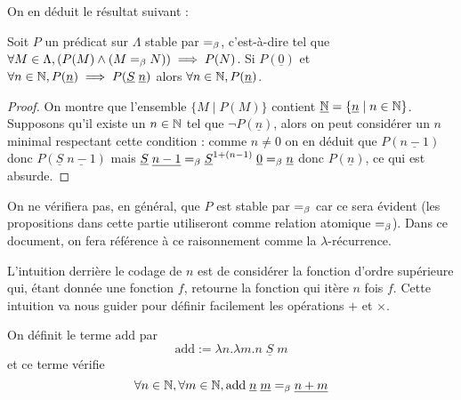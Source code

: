 On en déduit le résultat suivant :

\begin{cor}
    Soit $P$ un prédicat sur $\Lambda$ stable par $=_\beta$, c'est-à-dire tel que $\forall M\in\Lambda, (P(M)\land (M=_\beta N))\implies P(N)$. Si $P(\underline 0)$ et $\forall n\in\mathbb{N}, P(\underline n)\implies P(\underline S\;\underline n)$ alors $\forall n\in\mathbb{N}, P(\underline n)$.
\end{cor}

\begin{proof}
    On montre que l'ensemble $\{M\mid P(M)\}$ contient $\underline{\mathbb{N}} = \{\underline n\mid n\in\mathbb{N}\}$. Supposons qu'il existe un $n\in\mathbb{N}$ tel que $\lnot P(\underline n)$, alors on peut considérer un $n$ minimal respectant cette condition : comme $n\neq 0$ on en déduit que $P(\underline{n-1})$ donc $P(\underline S\;\underline{n-1})$ mais $\underline S\;\underline{n-1} =_\beta \underline S^{1+(n-1)}\;\underline 0 =_\beta \underline n$ donc $P(\underline n)$, ce qui est absurde.
\end{proof}

\begin{rmk}
    On ne vérifiera pas, en général, que $P$ est stable par $=_\beta$ car ce sera évident (les propositions dans cette partie utiliseront comme relation atomique $=_\beta$). Dans ce document, on fera référence à ce raisonnement comme la $\lambda$-récurrence.
\end{rmk}

L'intuition derrière le codage de $n$ est de considérer la fonction d'ordre supérieure qui, étant donnée une fonction $f$, retourne la fonction qui itère $n$ fois $f$. Cette intuition va nous guider pour définir facilement les opérations $+$ et $\times$.

\begin{defi}[Addition]
    On définit le terme $\mathrm{add}$ par $$\mathrm{add} := \lambda n.\lambda m. n\;\underline S\;m$$ et ce terme vérifie $$\forall n\in\mathbb{N},\forall m\in\mathbb{N}, \mathrm{add}\;\underline n\;\underline m =_\beta \underline{n+m}$$
\end{defi}

